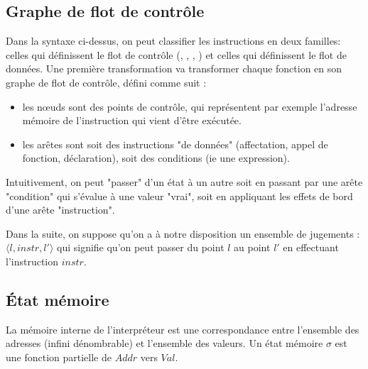 \subsection{Graphe de flot de contrôle}
\label{sec:cfg}

Dans la syntaxe ci-dessus, on peut classifier les instructions en deux familles:
celles qui définissent le flot de contrôle (\npkIf{$\cdot$}{$\cdot$}{$\cdot$},
\npkDoWith{$\cdot$}{$\cdot$}, \npkGoto{$\cdot$}, \npkWhile{$\cdot$}) et celles
qui définissent le flot de données. Une première transformation va transformer
chaque fonction en son graphe de flot de contrôle, défini comme suit :

\begin{itemize}
\item
  les nœuds sont des points de contrôle, qui représentent par exemple
  l'adresse mémoire de l'instruction qui vient d'être exécutée.
\item
  les arêtes sont soit des instructions "de données" (affectation,
  appel de fonction, déclaration), soit des conditions (ie une
  expression).
\end{itemize}

\begin{minipage}{0.5\textwidth}

\end{minipage}
\begin{minipage}{0.5\textwidth}

\end{minipage}



Intuitivement, on peut "passer" d'un état à un autre soit en passant par une
arête "condition" qui s'évalue à une valeur "vrai", soit en appliquant les
effets de bord d'une arête "instruction".

Dans la suite, on suppose qu'on a à notre disposition un ensemble de jugements :
$\langle l, instr, l' \rangle$ qui signifie qu'on peut passer du point $l$ au
point $l'$ en effectuant l'instruction $instr$.

\subsection{État mémoire}
\label{sec:sigma}

La mémoire interne de l'interpréteur est une correspondance entre l'ensemble des
adresses (infini dénombrable) et l'ensemble des valeurs. Un état mémoire $σ$ est
une fonction partielle de $Addr$ vers $Val$.


